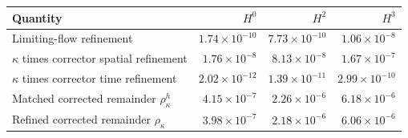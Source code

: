 \begin{tabular}{lrrr}
\toprule
Quantity & $H^0$ & $H^2$ & $H^3$\\
\midrule
Limiting-flow refinement & $1.74\times10^{-10}$ & $7.73\times10^{-10}$ & $1.06\times10^{-8}$\\
$\kappa$ times corrector spatial refinement & $1.76\times10^{-8}$ & $8.13\times10^{-8}$ & $1.67\times10^{-7}$\\
$\kappa$ times corrector time refinement & $2.02\times10^{-12}$ & $1.39\times10^{-11}$ & $2.99\times10^{-10}$\\
Matched corrected remainder $\rho_\kappa^h$ & $4.15\times10^{-7}$ & $2.26\times10^{-6}$ & $6.18\times10^{-6}$\\
Refined corrected remainder $\rho_\kappa$ & $3.98\times10^{-7}$ & $2.18\times10^{-6}$ & $6.06\times10^{-6}$\\
\bottomrule
\end{tabular}
